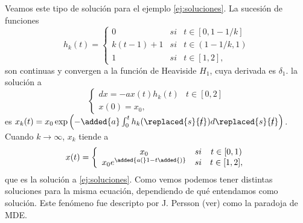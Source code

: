 \newpage

Veamos este  tipo de solución para  el ejemplo \eqref{ej:soluciones}. La sucesión de funciones
\begin{equation*}
h_k(t)=\left\{\begin{array}{ccc}
        0 & si & t\in[0,1-1/k]\\
        k(t-1)+1 & si & t\in(1-1/k,1)  \\
        1 &si & t\in[1,2],
    \end{array}\right.
\end{equation*}
son continuas y convergen \reversemarginpar{} a la función de Heaviside $H_1$, cuya derivada es $\delta_1$. \normalmarginpar{} la solución a
\begin{equation}
\left\{\begin{array}{lc}
        dx=-ax(t)h_k(t) & t\in[0,2]  \\
          x(0)=x_0, &
    \end{array}\right.
\end{equation}
es $x_k(t)=x_0\exp{\left(-\added{a}\int_0^th_k(\replaced{s}{\cancel{t}}) d\replaced{s}{\cancel{t}}\right)}$. Cuando $k\to \infty$, $x_k$ tiende a
\begin{equation*}
x(t)=\left\{\begin{array}{ccc}
        x_0 & si & t\in[0,1)\\
        
        x_0e^{\added{a(}1-t\added{)}}&si & t\in[1,2],
    \end{array}\right.
\end{equation*}
que es la solución a \eqref{ej:soluciones}. 
Como vemos podemos tener distintas soluciones para la misma ecuación, dependiendo de qué entendamos como solución.  Este fenómeno  {\color{green} fue descripto por J. Persson (ver\cite{persson1989regularization,S.T.Zavalishchin})} como la paradoja de  MDE.


 
 
 
 
 
 
 
 

